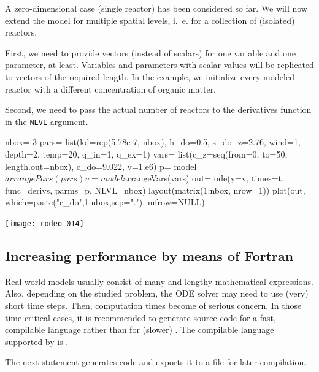 \documentclass[times,onecolumn]{article}
\begin{document}
A zero-dimensional case (single reactor) has been considered so far. We will now extend the model for multiple spatial levels, i.~e. for a collection of (isolated) reactors.

First, we need to provide vectors (instead of scalars) for one variable and one parameter, at least. Variables and parameters with scalar values will be replicated to vectors of the required length. In the example, we initialize every modeled reactor with a different concentration of organic matter.

Second, we need to pass the actual number of reactors to the derivatives function in the \verb!NLVL! argument.

\begin{Schunk}
\begin{Sinput}
 nbox= 3
 pars= list(kd=rep(5.78e-7, nbox), h_do=0.5, s_do_z=2.76, wind=1,
   depth=2, temp=20, q_in=1, q_ex=1)
 vars= list(c_z=seq(from=0, to=50, length.out=nbox), c_do=9.022,
   v=1.e6)
 p= model$arrangePars(pars)
 v= model$arrangeVars(vars)
 out= ode(y=v, times=t, func=derivs, parms=p, NLVL=nbox)
 layout(matrix(1:nbox, nrow=1))
 plot(out, which=paste("c_do",1:nbox,sep="."), mfrow=NULL)
\end{Sinput}
\end{Schunk}
\texttt{[image: rodeo-014]}


\subsection{Increasing performance by means of Fortran} \label{sec:advanced:fortran}

Real-world models usually consist of many and lengthy mathematical expressions. Also, depending on the studied problem, the ODE solver may need to use (very) short time steps. Then, computation times become of serious concern. In those time-critical cases, it is recommended to generate source code for a fast, compilable language rather than for (slower) . The compilable language supported by  is .

The next statement generates  code and exports it to a file for later compilation.

\begin{Schunk}
\end{Schunk}
\end{document}
